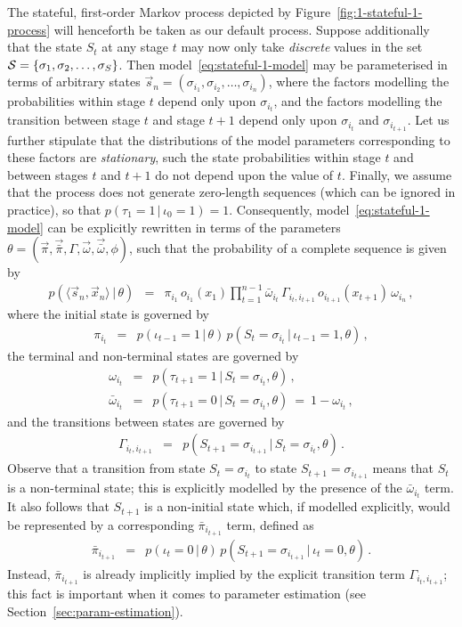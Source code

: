 \documentclass[a4paper]{article}
\begin{document}
The stateful, first-order Markov process depicted by Figure~\ref{fig:1-stateful-1-process} will henceforth be taken as our default process.
Suppose additionally that the state $S_t$ at any stage $t$ may now only take {\em discrete} values in the set ${\cal S}=\{\sigma_1,\sigma_2,\ldots,\sigma_S\}$.
Then model~\eqref{eq:stateful-1-model} may be parameterised in terms of arbitrary states $\vec{s}_n=(\sigma_{i_1},\sigma_{i_2},\ldots,\sigma_{i_n})$,
where the factors modelling the probabilities within stage $t$ depend only upon $\sigma_{i_t}$, and the factors modelling the transition between stage $t$ and stage $t+1$ 
depend only upon $\sigma_{i_t}$ and $\sigma_{i_{t+1}}$.
Let us further stipulate that the distributions of the model parameters corresponding to these factors are {\em stationary}, such the state probabilities within stage $t$ and between stages $t$ and $t+1$ 
do not depend upon the value of $t$.
Finally, we assume that the process does not generate zero-length sequences (which can be ignored in practice), so that $p(\tau_1=1\,|\,\iota_0=1)=1$.
Consequently, model~\eqref{eq:stateful-1-model} can be explicitly rewritten in terms of the parameters $\theta=(\vec{\pi},\vec{\bar{\pi}},\Gamma,\vec{\omega},\vec{\bar{\omega}},\phi)$, 
such that the probability of a complete sequence is given by
\begin{eqnarray}
p(\langle\vec{s}_n,\vec{x}_n\rangle\,|\,\theta) & = & \pi_{i_1}\,o_{i_1}(x_1)\prod_{t=1}^{n-1}\bar{\omega}_{i_t}\,\Gamma_{i_t,i_{t+1}}\,o_{i_{t+1}}(x_{t+1})\,\omega_{i_n}
\,,
\label{eq:p_s_x_g_theta}
\end{eqnarray}
where the initial state is governed by
\begin{eqnarray}
  \pi_{i_t} & = & p(\iota_{t-1}\!=\!1\,|\,\theta)\,p(S_t\!=\!\sigma_{i_t}\,|\,\iota_{t-1}\!=\!1,\theta)\,,
\end{eqnarray}
the terminal and non-terminal states are governed by
\begin{eqnarray}
  \omega_{i_t} & = & p(\tau_{t+1}=1\,|\,S_t\!=\!\sigma_{i_t},\theta)\,,
\\
  \bar{\omega}_{i_t} & = & p(\tau_{t+1}=0\,|\,S_t\!=\!\sigma_{i_t},\theta)~=~1-\omega_{i_t}\,,
\end{eqnarray}
and the transitions between states are governed by
\begin{eqnarray}
  \Gamma_{i_t,i_{t+1}} & = & p(S_{t+1}\!=\!\sigma_{i_{t+1}}\,|\,S_t\!=\!\sigma_{i_t},\theta)\,.
\end{eqnarray}
Observe that a transition from state $S_t=\sigma_{i_t}$ to state $S_{t+1}=\sigma_{i_{t+1}}$ means that $S_t$ is a non-terminal state; this is explicitly modelled by the
presence of the $\bar{\omega}_{i_t}$ term. It also follows that $S_{t+1}$ is a non-initial state which, if modelled explicitly, would be represented by a corresponding $\bar{\pi}_{i_{t+1}}$ term, defined as
\begin{eqnarray}
  \bar{\pi}_{i_{t+1}} & = & p(\iota_t\!=\!0\,|\,\theta)\,p(S_{t+1}\!=\!\sigma_{i_{t+1}}\,|\,\iota_t\!=\!0,\theta)\,.
\end{eqnarray}
Instead, $\bar{\pi}_{i_{t+1}}$ is already implicitly implied by the explicit transition term $\Gamma_{i_t,i_{t+1}}$; this fact is important when it comes to parameter estimation (see Section~\ref{sec:param-estimation}).
\end{document}
